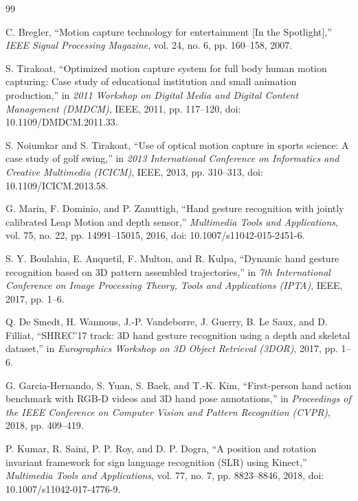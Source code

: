 \documentclass[10pt,twocolumn]{article}
\begin{document}
\begin{thebibliography}{99}

C. Bregler, ``Motion capture technology for entertainment [In the Spotlight],'' \textit{IEEE Signal Processing Magazine}, vol. 24, no. 6, pp. 160--158, 2007.

S. Tirakoat, ``Optimized motion capture system for full body human motion capturing: Case study of educational institution and small animation production,'' in \textit{2011 Workshop on Digital Media and Digital Content Management (DMDCM)}, IEEE, 2011, pp. 117--120, doi: 10.1109/DMDCM.2011.33.

S. Noiumkar and S. Tirakoat, ``Use of optical motion capture in sports science: A case study of golf swing,'' in \textit{2013 International Conference on Informatics and Creative Multimedia (ICICM)}, IEEE, 2013, pp. 310--313, doi: 10.1109/ICICM.2013.58.

G. Marin, F. Dominio, and P. Zanuttigh, ``Hand gesture recognition with jointly calibrated Leap Motion and depth sensor,'' \textit{Multimedia Tools and Applications}, vol. 75, no. 22, pp. 14991--15015, 2016, doi: 10.1007/s11042-015-2451-6.

S. Y. Boulahia, E. Anquetil, F. Multon, and R. Kulpa, ``Dynamic hand gesture recognition based on 3D pattern assembled trajectories,'' in \textit{7th International Conference on Image Processing Theory, Tools and Applications (IPTA)}, IEEE, 2017, pp. 1--6.

Q. De Smedt, H. Wannous, J.-P. Vandeborre, J. Guerry, B. Le Saux, and D. Filliat, ``SHREC'17 track: 3D hand gesture recognition using a depth and skeletal dataset,'' in \textit{Eurographics Workshop on 3D Object Retrieval (3DOR)}, 2017, pp. 1--6.

G. Garcia-Hernando, S. Yuan, S. Baek, and T.-K. Kim, ``First-person hand action benchmark with RGB-D videos and 3D hand pose annotations,'' in \textit{Proceedings of the IEEE Conference on Computer Vision and Pattern Recognition (CVPR)}, 2018, pp. 409--419.

P. Kumar, R. Saini, P. P. Roy, and D. P. Dogra, ``A position and rotation invariant framework for sign language recognition (SLR) using Kinect,'' \textit{Multimedia Tools and Applications}, vol. 77, no. 7, pp. 8823--8846, 2018, doi: 10.1007/s11042-017-4776-9.


\end{thebibliography}
\end{document}
